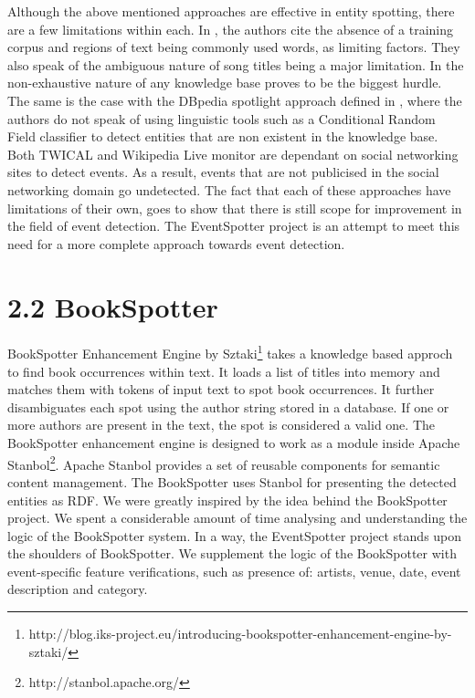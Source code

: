 \documentclass[a4paper,11pt]{report}
\begin{document}
Although the above mentioned approaches are effective in entity spotting, there are a few limitations within each. In \cite{Gruhl_contextand}, the authors cite the absence of a training corpus and regions of text being commonly used words, as limiting factors. They also speak of the ambiguous nature of song titles being a major limitation. In \cite{Hassell06ontology-drivenautomatic} the non-exhaustive nature of any knowledge base proves to be the biggest hurdle. The same is the case with the DBpedia spotlight approach defined in \cite{Mendes11dbpediaspotlight:}, where the authors do not speak of using linguistic tools such as a Conditional Random Field classifier to detect entities that are non existent in the knowledge base. Both TWICAL \cite{Ritter_opendomain} and Wikipedia Live monitor \cite{DBLP:journals/corr/abs-1303-4702} are dependant on social networking sites to detect events. As a result, events that are not publicised in the social networking domain go undetected. The fact that each of these approaches have limitations of their own, goes to show that there is still scope for improvement in the field of event detection. The EventSpotter project is an attempt to meet this need for a more complete approach towards event detection.

\section*{2.2 BookSpotter}

BookSpotter Enhancement Engine by Sztaki\footnote{http://blog.iks-project.eu/introducing-bookspotter-enhancement-engine-by-sztaki/} takes a knowledge based approch to find book occurrences within text. It loads a list of titles into memory and matches them with tokens of input text to spot book occurrences. It further disambiguates each spot using the author string stored in a database. If one or more authors are present in the text, the spot is considered a valid one. The BookSpotter enhancement engine is designed to work as a module inside Apache Stanbol\footnote{http://stanbol.apache.org/}. Apache Stanbol provides a set of reusable components for semantic content management. The BookSpotter uses Stanbol for presenting the detected entities as RDF. We were greatly inspired by the idea behind the BookSpotter project. We spent a considerable amount of time analysing and understanding the logic of the BookSpotter system. In a way, the EventSpotter project stands upon the shoulders of BookSpotter. We supplement the logic of the BookSpotter with event-specific feature verifications, such as presence of: artists, venue, date, event description and category.
\end{document}
